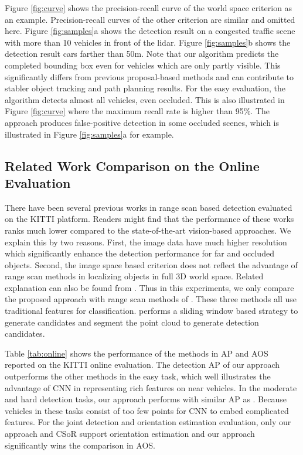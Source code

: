 \documentclass[conference]{IEEEtran}
\begin{document}
Figure \ref{fig:curve} shows the precision-recall curve of the world space criterion as an example. Precision-recall curves of the other criterion are similar and omitted here. Figure \ref{fig:samples}a shows the detection result on a congested traffic scene with more than 10 vehicles in front of the lidar.  Figure \ref{fig:samples}b shows the detection result cars farther than 50m. Note that our algorithm predicts the completed bounding box even for vehicles which are only partly visible. This significantly differs from previous proposal-based methods and can contribute to stabler object tracking and path planning results. For the easy evaluation, the algorithm detects almost all vehicles, even occluded. This is also illustrated in Figure \ref{fig:curve} where the maximum recall rate is higher than 95\%. The approach produces false-positive detection in some occluded scenes, which is illustrated in Figure \ref{fig:samples}a for example.


\subsection{Related Work Comparison on the Online Evaluation}
\label{sec:online}
There have been several previous works in range scan based detection evaluated on the KITTI platform. Readers might find that the performance of these works ranks much lower compared to the state-of-the-art vision-based approaches. We explain this by two reasons. First, the image data have much higher resolution which significantly enhance the detection performance for far and occluded objects. Second, the image space based criterion does not reflect the advantage of range scan methods in localizing objects in full 3D world space.  Related explanation can also be found from \citet{Wang}. Thus in this experiments, we only compare the proposed approach with range scan methods of \citet{Wang, Behley2013a, thesisSTUDIENARBEITPlotkin}. These three methods all use traditional features for classification. \citet{Wang} performs a sliding window based strategy to generate candidates and \citet{Behley2013a, thesisSTUDIENARBEITPlotkin} segment the point cloud to generate detection candidates.

Table \ref{tab:online} shows the performance of the methods in AP and AOS reported on the KITTI online evaluation. The detection AP of our approach outperforms the other methods in the easy task, which well illustrates the advantage of CNN in representing rich features on near vehicles. In the moderate and hard detection tasks, our approach performs with similar AP as \citet{Wang}. Because vehicles in these tasks consist of too few points for CNN to embed complicated features. For the joint detection and orientation estimation evaluation, only our approach and CSoR support orientation estimation and our approach significantly wins the comparison in AOS.
\end{document}
